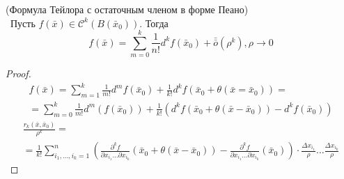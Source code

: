 \begin{theorem}(Формула Тейлора с остаточным членом в форме Пеано)\\\
    Пусть $f(\bar{x})\in \mathcal{C}^k(B(\bar{x}_0))$. Тогда
    \[f(\bar{x})=\sum\limits_{m=0}^{k}\frac{1}{n!}d^k f(\bar{x}_0)+\bar{\bar{o}}{(\rho^k)}, \rho\to 0\] 
\end{theorem} 
\begin{proof}
    \begin{multline*}
        f(\bar{x})=\sum\limits_{m=1}^{k}\frac{1}{m!} d^m f(\bar{x}_0)+\frac{1}{k!}d^k f(\bar{x}_0+\theta(\bar{x}=\bar{x}_0))=\\
        =\sum\limits_{m=0}^{k} \frac{1}{m!} d^m(f(\bar{x}_0))+\frac{1}{k!}(d^kf(\bar{x}_0+\theta(\bar{x}-\bar{x}_0))-d^k f(\bar{x}_0))
    \end{multline*}
    \begin{multline*}
        \frac{r_k(\bar{x},\bar{x}_0)}{\rho^k}=\\=\frac{1}{k!}\sum\limits_{i_1,\dots, i_k=1}^{n}\left(\frac{\partial^k {f}}{\partial {x_{i_1}}\dots \partial x_{i_k}}(\bar{x}_0+\theta (\bar{x}-\bar{x}_0))-\frac{\partial^k {f}}{\partial {x_{i_1}}\dots \partial x_{i_k}}(\bar{x}_0)\right)\cdot \frac{\Delta x_{i_1}}{\rho}\dots \frac{\Delta x_{i_k}}{\rho}
    \end{multline*}
\end{proof} 
